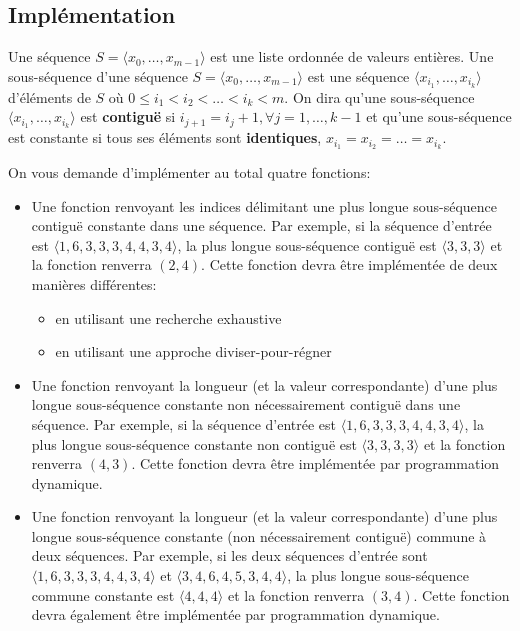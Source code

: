 \documentclass[a4paper,10pt]{article}
\begin{document}
\subsection*{Implémentation}

Une séquence $S=\langle x_0,\ldots,x_{m-1}\rangle$ est une liste
ordonnée de valeurs entières. Une sous-séquence d'une séquence
$S=\langle x_0,\ldots,x_{m-1}\rangle$ est une séquence $\langle
x_{i_1},\ldots,x_{i_k}\rangle$ d'éléments de $S$ où $0\leq i_1<i_2<\ldots<i_k<m$. On
dira qu'une sous-séquence $\langle x_{i_1},\ldots,x_{i_k}\rangle$ est
{\bf contiguë} si $i_{j+1}=i_{j}+1, \forall j=1,\ldots,k-1$ et qu'une
sous-séquence est constante si tous ses éléments sont {\bf identiques},
$x_{i_1}=x_{i_2}=\ldots=x_{i_k}$.

On vous demande d'implémenter au total quatre fonctions:
\begin{itemize}
\item Une fonction renvoyant les indices délimitant une plus longue
  sous-séquence contiguë constante dans une séquence. Par exemple, si
  la séquence d'entrée est $\langle 1,6,3,3,3,4,4,3,4\rangle$, la plus
  longue sous-séquence contiguë est $\langle 3,3,3\rangle$ et la
  fonction renverra $(2,4)$. Cette fonction devra être implémentée de
  deux manières différentes:
\begin{itemize}
\item en utilisant une recherche exhaustive
\item en utilisant une approche diviser-pour-régner
\end{itemize}
\item Une fonction renvoyant la longueur (et la valeur correspondante)
  d'une plus longue sous-séquence constante non nécessairement
  contiguë dans une séquence. Par exemple, si la séquence d'entrée est
  $\langle 1,6,3,3,3,4,4,3,4\rangle$, la plus longue sous-séquence
  constante non contiguë est $\langle 3,3,3,3\rangle$ et la fonction
  renverra $(4,3)$. Cette fonction devra être implémentée par
 programmation dynamique.
\item Une fonction renvoyant la longueur (et la valeur correspondante)
  d'une plus longue sous-séquence constante (non nécessairement
  contiguë) commune à deux séquences. Par exemple, si les deux
  séquences d'entrée sont $\langle 1,6,3,3,3,4,4,3,4\rangle$ et
  $\langle 3,4,6,4,5,3,4,4\rangle$, la plus longue sous-séquence
  commune constante est $\langle 4,4,4 \rangle$ et la fonction
  renverra $(3,4)$. Cette fonction devra également être implémentée
  par programmation dynamique.
\end{itemize}
\end{document}
